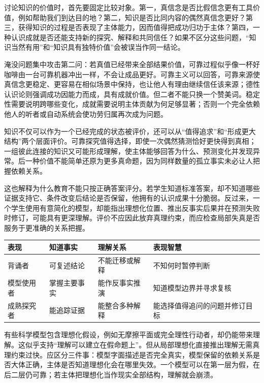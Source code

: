 讨论知识的价值时，首先要固定比较对象。第一，真信念是否比假信念更有工具价值，例如帮助我们到达目的地？第二，知识是否比同内容的偶然真信念更好？第三，获得知识的过程是否表现了主体能力，因而值得把成功归功于主体？第四，一种认识成就是否还能支持新的探究、解释和共同信任？如果不区分这些问题，“知识当然有用”和“知识具有独特价值”会被误当作同一结论。

淹没问题集中攻击第二问：若真值已经带来全部结果价值，可靠过程似乎像一杯好咖啡由一台可靠机器冲出一样，不会让成品更好。可靠主义可以回答，可靠来源使真信念更稳定、更容易在相似场景中保持，也让他人有理由继续信任该来源；德性认识论则强调成功因能力而成，具有成就价值\parencite{zagzebski1996,sosa2007}。但二者不能只换一个赞美词。稳定性需要说明跨哪些变化，成就需要说明主体贡献为何足够显著；否则一个完全依赖他人的听者或自动系统会使功劳归属再次成为问题。

知识不仅可以作为一个已经完成的状态被评价，还可以从“值得追求”和“形成更大结构”两个层面评价。可靠探究值得选择，即使一次偶然猜测恰好更快得到真相；一组彼此连接的知识又可能形成理解，使主体能够回答为什么、预测变化并发现异常。后一种价值不能简单还原为更多真命题，因为同样数量的孤立事实未必让人把握依赖关系\parencite{kvanvig2003,grimm2006}。

这也解释为什么教育不能只按正确答案评分。若学生知道标准答案，却不知道哪些证据支持它、条件改变后结论是否保留，他拥有的认识成果十分脆弱。反过来，一个学生使用有意简化的模型，却能指出理想化位置、推出反事实后果并在预测失败时修订，可能具有更深理解。评价不应因此放弃真理约束，而应检查局部失真是否服务于更准确的关系把握。

\begin{center}
\begin{tabularx}{\textwidth}{p{}XXX}
\toprule
表现 & 知道事实 & 理解关系 & 表现智慧\\
\midrule
背诵者 & 可复述结论 & 不能迁移或解释 & 不知何时暂停判断\\
模型使用者 & 掌握主要事实 & 能作反事实推演 & 知道模型边界并寻求复核\\
成熟探究者 & 能追踪证据 & 能整合多种解释 & 能选择值得追问的问题并修订目标\\
\bottomrule
\end{tabularx}
\end{center}

有些科学模型包含理想化假设，例如无摩擦平面或完全理性行动者，却仍能带来理解。这似乎支持“理解可以建立在假命题上”。但从局部理想化直接推出理解无需真理约束过快。应区分三件事：模型字面描述是否完全真实，模型保留的依赖关系是否大体正确，主体是否知道理想化会在哪里失效。一个模型可以在第一层为假，在后二层仍可靠；若主体把理想化当作现实全部结构，理解就会崩溃。

